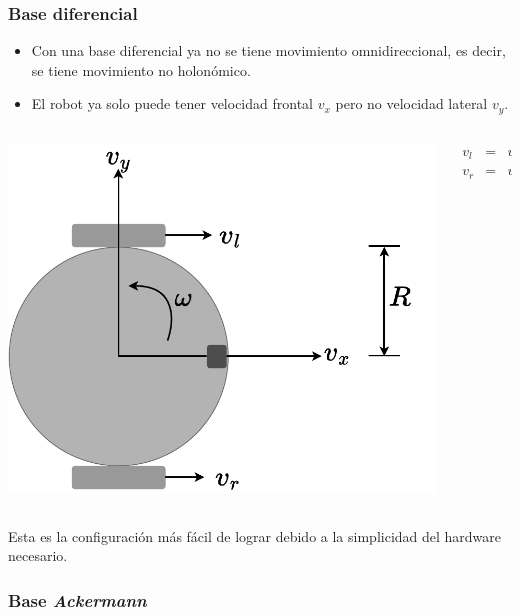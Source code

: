 \begin{frame}\frametitle{Base diferencial}
  \begin{itemize}
  \item Con una base diferencial ya no se tiene movimiento omnidireccional, es decir, se tiene movimiento no holonómico.
  \item El robot ya solo puede tener velocidad frontal $v_x$ pero no velocidad lateral $v_y$.
  \end{itemize}
  \begin{columns}
    \begin{column}{0.4\textwidth}
      \includegraphics[width=\textwidth]{Figures/DifferentialBase.pdf}
    \end{column}
    \begin{column}{0.6\textwidth}
      \begin{eqnarray*}
        v_l &=& v_x - R\omega\\
        v_r &=& v_x + R\omega
      \end{eqnarray*}
    \end{column}
  \end{columns}
  Esta es la configuración más fácil de lograr debido a la simplicidad del hardware necesario. 
\end{frame}

\begin{frame}\frametitle{Base \textit{Ackermann}}
  
\end{frame}

